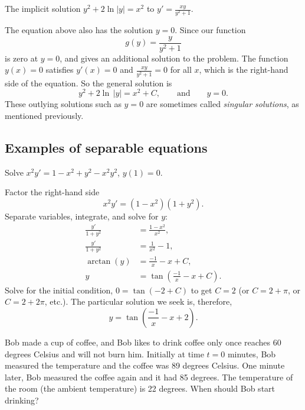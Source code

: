 \begin{myfig}
\capstart
{}
\caption{The implicit solution $y^2+2\ln|y|=x^2$ to $y'=\frac{xy}{y^2+1}$.\label{implicitsols:fig}}
\end{myfig}


The equation above also has the solution $y=0$. Since our function
\[ g(y) = \frac{y}{y^2 + 1}\] is zero at $y=0$, and gives an additional solution to the problem. The function $y(x) = 0$ satisfies $y'(x) = 0$ and $\frac{xy}{y^2 + 1} = 0$ for all $x$, which is the right-hand side of the equation. 
So the general solution is 
\begin{equation*}
y^2 + 2 \ln \, \lvert y \rvert = x^2 + C, \qquad \text{and} \qquad y=0.
\end{equation*}
These outlying solutions
such as $y=0$
are sometimes called \emph{singular solutions}, as mentioned previously.

\subsection{Examples of separable equations}

\begin{example}
Solve $x^2y' = 1 - x^2+y^2 - x^2y^2$, $y(1) = 0$.
\end{example}
\begin{exampleSol}
Factor the right-hand side
\begin{equation*}
x^2y' = (1 - x^2)(1+y^2) .
\end{equation*}
Separate variables, integrate, and solve for $y$:
\begin{align*}
\frac{y'}{1+y^2} & = \frac{1 - x^2}{x^2} , \\
\frac{y'}{1+y^2} & = \frac{1}{x^2} - 1 , \\
\operatorname{arctan} (y) & = \frac{-1}{x} - x + C , \\
y & = \tan \left(\frac{-1}{x} - x + C\right) .
\end{align*}
Solve for the initial condition, $0 = \tan(-2+C)$ to get $C=2$ (or $C = 2 +
\pi$, or $C = 2 + 2\pi$, etc.).  The particular solution we seek is, therefore,
\begin{equation*}
y = \tan \left(\frac{-1}{x} - x + 2 \right) .
\end{equation*}
\end{exampleSol}

\begin{example} \label{sep:coffeeexample}
Bob made a cup of coffee, and
Bob likes to drink coffee only once reaches 60 degrees Celsius and will not burn him.
Initially at time $t=0$ minutes,
Bob measured the temperature and the coffee was 89 degrees Celsius.
One minute later, Bob measured the coffee again and it had 85 degrees.
The temperature of the room (the ambient temperature) is 22 degrees.
When should Bob start drinking?
\end{example}

